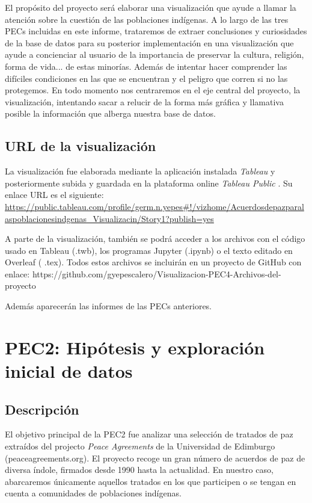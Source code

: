 \documentclass[11pt]{article}
\begin{document}
El propósito del proyecto será elaborar una visualización que ayude a llamar la atención sobre la cuestión de las poblaciones indígenas. A lo largo de las tres PECs incluidas en este informe, trataremos de extraer conclusiones y curiosidades de la base de datos para su posterior implementación en una visualización que ayude a concienciar al usuario de la importancia de preservar la cultura, religión, forma de vida... de estas minorías. Además de intentar hacer comprender las difíciles condiciones en las que se encuentran y el peligro que corren si no las protegemos. En todo momento nos centraremos en el eje central del proyecto, la visualización, intentando sacar a relucir de la forma más gráfica y llamativa posible la información que alberga nuestra base de datos.

\subsection{URL de la visualización}

La visualización fue elaborada mediante la aplicación instalada \emph{Tableau} \cite{tableau} y posteriormente
subida y guardada en la plataforma online \emph{Tableau Public} \cite{public}. Su enlace URL es el siguiente:
\url{https://public.tableau.com/profile/germ.n.yepes#!/vizhome/Acuerdosdepazparalaspoblacionesindgenas_Visualizacin/Story1?publish=yes}

A parte de la visualización, también se podrá acceder a los archivos con el código usado en Tableau (.twb), los programas Jupyter (.ipynb) o el texto editado en Overleaf ( .tex). Todos estos archivos se incluirán en un proyecto de GitHub \cite{github} con enlace: 
https://github.com/gyepescalero/Visualizacion-PEC4-Archivos-del-proyecto

Además aparecerán las informes de las PECs anteriores.

\section{PEC2: Hipótesis y exploración inicial de datos}\label{PEC2}

\subsection{Descripción}

El objetivo principal de la PEC2 fue analizar una selección de tratados de paz extraídos del projecto \emph{Peace Agreements} de la
Universidad de Edimburgo (peaceagreements.org). El proyecto recoge un
gran número de acuerdos de paz de diversa índole, firmados desde 1990
hasta la actualidad. En nuestro caso, abarcaremos únicamente aquellos
tratados en los que participen o se tengan en cuenta a comunidades de
poblaciones indígenas.
\end{document}
